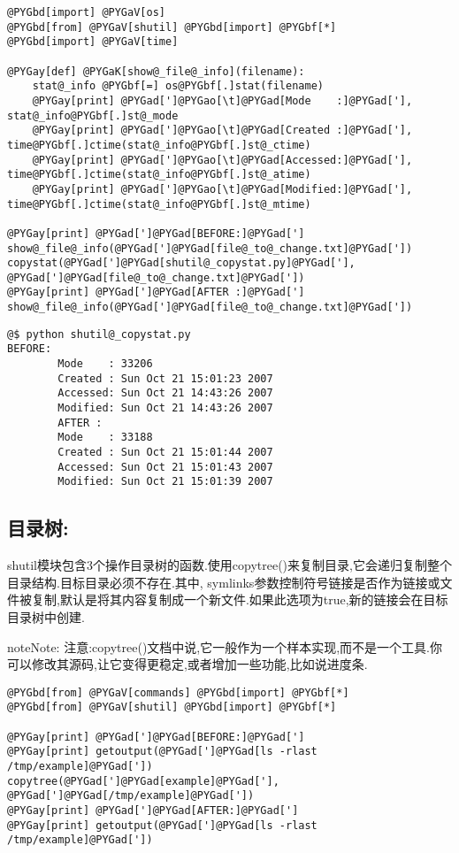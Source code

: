 \documentclass[letterpaper,10pt,english]{manual}
\begin{document}
\begin{Verbatim}[commandchars=@\[\]]
@PYGbd[import] @PYGaV[os]
@PYGbd[from] @PYGaV[shutil] @PYGbd[import] @PYGbf[*]
@PYGbd[import] @PYGaV[time]

@PYGay[def] @PYGaK[show@_file@_info](filename):
    stat@_info @PYGbf[=] os@PYGbf[.]stat(filename)
    @PYGay[print] @PYGad[']@PYGao[\t]@PYGad[Mode    :]@PYGad['], stat@_info@PYGbf[.]st@_mode
    @PYGay[print] @PYGad[']@PYGao[\t]@PYGad[Created :]@PYGad['], time@PYGbf[.]ctime(stat@_info@PYGbf[.]st@_ctime)
    @PYGay[print] @PYGad[']@PYGao[\t]@PYGad[Accessed:]@PYGad['], time@PYGbf[.]ctime(stat@_info@PYGbf[.]st@_atime)
    @PYGay[print] @PYGad[']@PYGao[\t]@PYGad[Modified:]@PYGad['], time@PYGbf[.]ctime(stat@_info@PYGbf[.]st@_mtime)

@PYGay[print] @PYGad[']@PYGad[BEFORE:]@PYGad[']
show@_file@_info(@PYGad[']@PYGad[file@_to@_change.txt]@PYGad['])
copystat(@PYGad[']@PYGad[shutil@_copystat.py]@PYGad['], @PYGad[']@PYGad[file@_to@_change.txt]@PYGad['])
@PYGay[print] @PYGad[']@PYGad[AFTER :]@PYGad[']
show@_file@_info(@PYGad[']@PYGad[file@_to@_change.txt]@PYGad['])
\end{Verbatim}

\begin{Verbatim}[commandchars=@\[\]]
@$ python shutil@_copystat.py
BEFORE:
        Mode    : 33206
        Created : Sun Oct 21 15:01:23 2007
        Accessed: Sun Oct 21 14:43:26 2007
        Modified: Sun Oct 21 14:43:26 2007
        AFTER :
        Mode    : 33188
        Created : Sun Oct 21 15:01:44 2007
        Accessed: Sun Oct 21 15:01:43 2007
        Modified: Sun Oct 21 15:01:39 2007
\end{Verbatim}


\subsection{目录树:}

shutil模块包含3个操作目录树的函数.使用copytree()来复制目录,它会递归复制整个目录结构.目标目录必须不存在.其中, symlinks参数控制符号链接是否作为链接或文件被复制,默认是将其内容复制成一个新文件.如果此选项为true,新的链接会在目标目录树中创建.

\begin{notice}{note}{Note:}
注意:copytree()文档中说,它一般作为一个样本实现,而不是一个工具.你可以修改其源码,让它变得更稳定,或者增加一些功能,比如说进度条.
\end{notice}

\begin{Verbatim}[commandchars=@\[\]]
@PYGbd[from] @PYGaV[commands] @PYGbd[import] @PYGbf[*]
@PYGbd[from] @PYGaV[shutil] @PYGbd[import] @PYGbf[*]

@PYGay[print] @PYGad[']@PYGad[BEFORE:]@PYGad[']
@PYGay[print] getoutput(@PYGad[']@PYGad[ls -rlast /tmp/example]@PYGad['])
copytree(@PYGad[']@PYGad[example]@PYGad['], @PYGad[']@PYGad[/tmp/example]@PYGad['])
@PYGay[print] @PYGad[']@PYGad[AFTER:]@PYGad[']
@PYGay[print] getoutput(@PYGad[']@PYGad[ls -rlast /tmp/example]@PYGad['])
\end{Verbatim}
\end{document}
